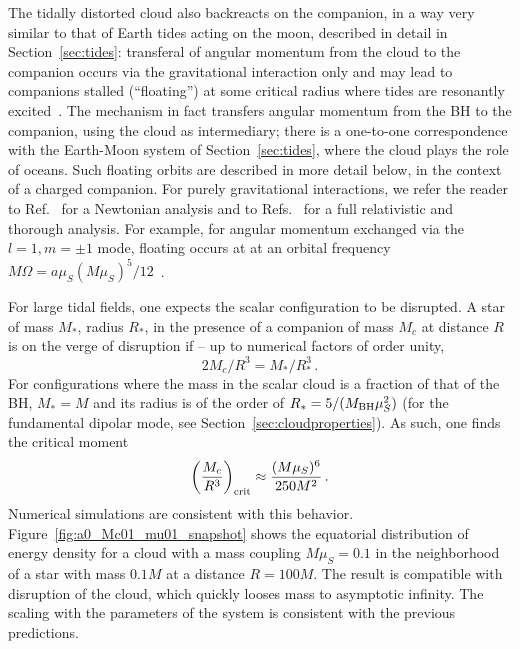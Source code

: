 \documentclass[11pt]{article}
\newcommand{\be}{\begin{equation}}
\newcommand{\ee}{\end{equation}}
\numberwithin{equation}{section} %
\begin{document}
The tidally distorted cloud also backreacts on the companion, in a way very similar to that of Earth tides acting on the 
moon, described in detail in Section~\ref{sec:tides}: transferal of angular momentum from the cloud to the companion 
occurs via the gravitational interaction only and may lead to companions stalled (``floating'') at some critical radius where tides are 
resonantly excited~\cite{Cardoso:2011xi,Ferreira:2017pth,Zhang:2018kib}. The mechanism in fact transfers angular momentum from the BH to the companion, using the cloud as intermediary; there is a one-to-one correspondence with the Earth-Moon system of Section~\ref{sec:tides}, where the cloud plays the role of oceans. Such floating orbits are described in more 
detail below, in the context of a charged companion. For purely gravitational interactions, we refer the reader to 
Ref.~\cite{Ferreira:2017pth} for a Newtonian analysis and to Refs.~\cite{Cardoso:2011xi,Zhang:2018kib,Baumann:2019ztm} for a full 
 relativistic and thorough analysis. For example, for angular momentum exchanged via the $l=1,m=\pm 1$ mode, floating occurs at
at an orbital frequency $M\Omega=a\mu_{S}(M\mu_{S})^5/12$~\cite{Zhang:2018kib,Baumann:2019ztm}. 


For large tidal fields, one expects the scalar configuration to be disrupted. A star of mass $M_*$, radius $R_*$, in the 
presence of a companion of mass $M_c$ at distance $R$ is on the verge of disruption if -- up to numerical factors of 
order unity,
%
\be
2M_c/R^3=M_*/R_*^3\,.
\ee
%
For configurations where the mass in the scalar cloud is a fraction of that of the BH, $M_*=M$ and its radius is of the 
order of $R_*=5/(M_{\rm BH}\mu_{S}^2)$ (for the fundamental dipolar mode, see Section~\ref{sec:cloudproperties}). As 
such, one finds the critical moment 
%
\be
\left(\frac{M_c}{R^3}\right)_{\rm crit}\approx\frac{(M\mu_{S})^6}{250M^2}\,.\label{tde_scaling}
\ee
%
Numerical simulations are consistent with this behavior. Figure~\ref{fig:a0_Mc01_mu01_snapshot} shows the equatorial 
distribution of energy density for a cloud with a mass coupling $M\mu_{S}=0.1$ in the neighborhood of a star with 
mass $0.1M$ at a distance $R=100M$.
The result is compatible with disruption of the cloud, which quickly looses mass to asymptotic infinity. The scaling 
with the parameters of the system is consistent with the previous predictions.
\end{document}
